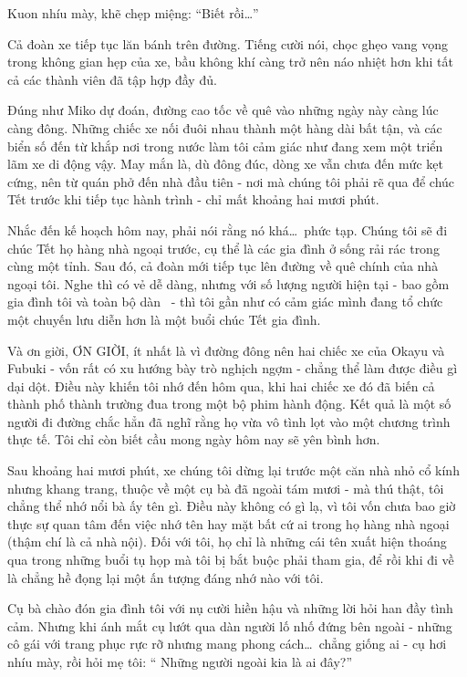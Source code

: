 \documentclass[../main.tex]{subfiles}
\begin{document}
Kuon nhíu mày, khẽ chẹp miệng: ``Biết rồi\dots''

Cả đoàn xe tiếp tục lăn bánh trên đường. Tiếng cười nói, chọc ghẹo vang vọng trong không gian hẹp của xe, bầu không khí càng trở nên náo nhiệt hơn khi tất cả các thành viên đã tập hợp đầy đủ.

\ct


Đúng như Miko dự đoán, đường cao tốc về quê vào những ngày này càng lúc càng đông. Những chiếc xe nối đuôi nhau thành một hàng dài bất tận, và các biển số đến từ khắp nơi trong nước làm tôi cảm giác như đang xem một triển lãm xe di động vậy. May mắn là, dù đông đúc, dòng xe vẫn chưa đến mức kẹt cứng, nên từ quán phở đến nhà đầu tiên - nơi mà chúng tôi phải rẽ qua để chúc Tết trước khi tiếp tục hành trình - chỉ mất khoảng hai mươi phút.

Nhắc đến kế hoạch hôm nay, phải nói rằng nó khá\dots\ phức tạp. Chúng tôi sẽ đi chúc Tết họ hàng nhà ngoại trước, cụ thể là các gia đình ở sống rải rác trong cùng một tỉnh. Sau đó, cả đoàn mới tiếp tục lên đường về quê chính của nhà ngoại tôi. Nghe thì có vẻ dễ dàng, nhưng với số lượng người hiện tại - bao gồm gia đình tôi và toàn bộ dàn \hll\ - thì tôi gần như có cảm giác mình đang tổ chức một chuyến lưu diễn hơn là một buổi chúc Tết gia đình.

Và ơn giời, ƠN GIỜI, ít nhất là vì đường đông nên hai chiếc xe của Okayu và Fubuki - vốn rất có xu hướng bày trò nghịch ngợm - chẳng thể làm được điều gì dại dột. Điều này khiến tôi nhớ đến hôm qua, khi hai chiếc xe đó đã biến cả thành phố thành trường đua trong một bộ phim hành động. Kết quả là một số người đi đường chắc hẳn đã nghĩ rằng họ vừa vô tình lọt vào một chương trình thực tế. Tôi chỉ còn biết cầu mong ngày hôm nay sẽ yên bình hơn.

Sau khoảng hai mươi phút, xe chúng tôi dừng lại trước một căn nhà nhỏ cổ kính nhưng khang trang, thuộc về một cụ bà đã ngoài tám mươi - mà thú thật, tôi chẳng thể nhớ nổi bà ấy tên gì. Điều này không có gì lạ, vì tôi vốn chưa bao giờ thực sự quan tâm đến việc nhớ tên hay mặt bất cứ ai trong họ hàng nhà ngoại (thậm chí là cả nhà nội). Đối với tôi, họ chỉ là những cái tên xuất hiện thoáng qua trong những buổi tụ họp mà tôi bị bắt buộc phải tham gia, để rồi khi đi về là chẳng hề đọng lại một ấn tượng đáng nhớ nào với tôi.

Cụ bà chào đón gia đình tôi với nụ cười hiền hậu và những lời hỏi han đầy tình cảm. Nhưng khi ánh mắt cụ lướt qua dàn người lố nhố đứng bên ngoài - những cô gái với trang phục rực rỡ nhưng mang phong cách\dots\ chẳng giống ai - cụ hơi nhíu mày, rồi hỏi mẹ tôi: ``{\color{red} Những người ngoài kia là ai đây?}''
\end{document}
